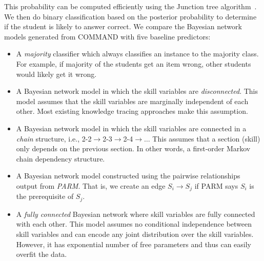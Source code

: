 \documentclass{edm_template}
\begin{document}
	This probability can be computed efficiently using the Junction tree algorithm~\cite{koller2009probabilistic}. 
	We then do binary classification based on the posterior probability to determine if the student is likely to answer correct.
	We compare the Bayesian network models generated from COMMAND with five baseline predictors:
	\begin{itemize}[topsep=2pt,parsep=0pt,partopsep=0pt]
		\item  A \emph{majority} classifier which always classifies  an instance to the majority class.
		For example, if majority of the students get an item wrong, other students would likely get it wrong.
		\item  A Bayesian network model in which the skill variables are \emph{disconnected}. 
		This model assumes that the skill variables are marginally independent of each other. Most existing knowledge tracing approaches make this assumption.
		\item A Bayesian network model in which the skill variables are connected in a \emph{chain} structure, i.e., 2-2$\rightarrow$2-3$\rightarrow$2-4$\rightarrow\dots$
		This assumes that a section (skill) only depends on the previous section.
		In other words, a first-order Markov chain dependency structure.
		\item A Bayesian network model constructed using the pairwise relationships output from \emph{PARM}. 
		That is, we create an edge $S_i\rightarrow S_j$ if PARM says $S_i$ is the prerequisite of $S_j$.
		\item A \emph{fully connected} Bayesian network where skill variables are fully connected with each other.
		This model assumes no conditional independence between skill variables and can encode any joint distribution over the skill variables.
		However, it has exponential number of free parameters and thus can easily overfit the data.
	\end{itemize}
\end{document}

